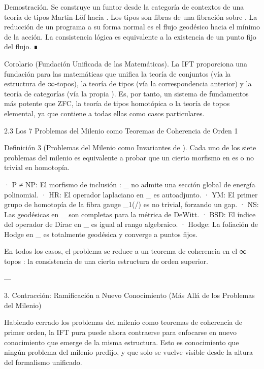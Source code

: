 \documentclass[12pt,twoside]{book}
\begin{document}
Demostración. Se construye un funtor desde la categoría de contextos de una teoría de tipos Martin-Löf hacia   . Los tipos son fibras de una fibración sobre   . La reducción de un programa a su forma normal es el flujo geodésico hacia el mínimo de la acción. La consistencia lógica es equivalente a la existencia de un punto fijo del flujo. ∎

Corolario (Fundación Unificada de las Matemáticas). La IFT proporciona una fundación para las matemáticas que unifica la teoría de conjuntos (vía la estructura de ∞-topos), la teoría de tipos (vía la correspondencia anterior) y la teoría de categorías (vía la propia   ). Es, por tanto, un sistema de fundamentos más potente que ZFC, la teoría de tipos homotópica o la teoría de topos elemental, ya que contiene a todas ellas como casos particulares.

2.3 Los 7 Problemas del Milenio como Teoremas de Coherencia de Orden 1

Definición 3 (Problemas del Milenio como Invariantes de   ). Cada uno de los siete problemas del milenio es equivalente a probar que un cierto morfismo en    es o no trivial en homotopía.

· P ≠ NP: El morfismo de inclusión  \iota: _{} \hookrightarrow {}  no admite una sección global de energía polinomial.
· HR: El operador laplaciano en  _{}  es autoadjunto.
· YM: El primer grupo de homotopía de la fibra gauge  \pi_1(/)  es no trivial, forzando un gap.
· NS: Las geodésicas en  _{}  son completas para la métrica de DeWitt.
· BSD: El índice del operador de Dirac en  _{}  es igual al rango algebraico.
· Hodge: La foliación de Hodge en  _{}  es totalmente geodésica y converge a puntos fijos.

En todos los casos, el problema se reduce a un teorema de coherencia en el ∞-topos   : la consistencia de una cierta estructura de orden superior.

---

3. Contracción: Ramificación a Nuevo Conocimiento (Más Allá de los Problemas del Milenio)

Habiendo cerrado los problemas del milenio como teoremas de coherencia de primer orden, la IFT pura puede ahora contraerse para enfocarse en nuevo conocimiento que emerge de la misma estructura. Esto es conocimiento que ningún problema del milenio predijo, y que solo se vuelve visible desde la altura del formalismo unificado.
\end{document}
